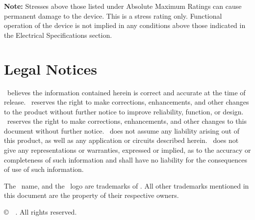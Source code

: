\documentclass[10pt]{datasheet}
\begin{document}
	\textbf{Note:} Stresses above those listed under Absolute Maximum Ratings can
	cause permanent damage to the device. This is a stress rating only. Functional
	operation of the device is not implied in any conditions above those indicated
	in the Electrical Specifications section.

\clearpage

\begin{versionhistory}
\end{versionhistory}

\section{Legal Notices}

\Company\ believes the information contained herein is correct and accurate at the time of release. 
\Company\ reserves the right to make corrections, enhancements, and other changes to the product without further notice to improve reliability, function, or design.
\Company\ reserves the right to make corrections, enhancements, and other changes to this document without further notice.
\Company\ does not assume any liability arising out of this product, as well as any application or circuits described herein.
\Company\ does not give any representations or warranties, expressed or implied, as to the accuracy or completeness of such information and shall have no liability for the consequences of use of such information.

The \Company\ name, and the \Author\ logo are trademarks of \Company. All other trademarks mentioned in this document are the property of their respective owners.

\copyright\ \the\year\ \Company. All rights reserved.
\end{document}
